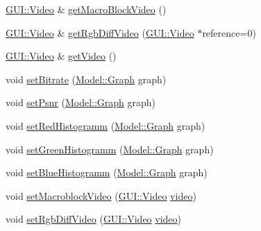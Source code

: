 \begin{DoxyCompactItemize}
\hyperlink{classGUI_1_1Video}{G\+U\+I\+::\+Video} \& \hyperlink{classModel_1_1EncodedVideo_ac27f73ee98887ca0325a2e411f2ac0a2}{get\+Macro\+Block\+Video} ()
\item 
\hyperlink{classGUI_1_1Video}{G\+U\+I\+::\+Video} \& \hyperlink{classModel_1_1EncodedVideo_a40bff15a57c48e30b074df886f469dcb}{get\+Rgb\+Diff\+Video} (\hyperlink{classGUI_1_1Video}{G\+U\+I\+::\+Video} $\ast$reference=0)
\item 
\hyperlink{classGUI_1_1Video}{G\+U\+I\+::\+Video} \& \hyperlink{classModel_1_1EncodedVideo_a98d400f18a58a86564ce1fb048bd5fad}{get\+Video} ()
\item 
void \hyperlink{classModel_1_1EncodedVideo_a60a6dd2db95a7b5512b119592154c542}{set\+Bitrate} (\hyperlink{classModel_1_1Graph}{Model\+::\+Graph} graph)
\item 
void \hyperlink{classModel_1_1EncodedVideo_a1ab9a88bf6af5d5c764512703becc453}{set\+Psnr} (\hyperlink{classModel_1_1Graph}{Model\+::\+Graph} graph)
\item 
void \hyperlink{classModel_1_1EncodedVideo_a50a774bf6d0a0445ad71fce4030f923b}{set\+Red\+Histogramm} (\hyperlink{classModel_1_1Graph}{Model\+::\+Graph} graph)
\item 
void \hyperlink{classModel_1_1EncodedVideo_a566ac8c5c38d5e9ff92033d425ad1af5}{set\+Green\+Histogramm} (\hyperlink{classModel_1_1Graph}{Model\+::\+Graph} graph)
\item 
void \hyperlink{classModel_1_1EncodedVideo_a73e0e302836a23164bc5fafc2efcb412}{set\+Blue\+Histogramm} (\hyperlink{classModel_1_1Graph}{Model\+::\+Graph} graph)
\item 
void \hyperlink{classModel_1_1EncodedVideo_a3487e25c309f036991a8fe323110fa54}{set\+Macroblock\+Video} (\hyperlink{classGUI_1_1Video}{G\+U\+I\+::\+Video} \hyperlink{classModel_1_1EncodedVideo_a03e0f42a43f7a856dd9881df4024fb4c}{video})
\item 
void \hyperlink{classModel_1_1EncodedVideo_a6e0348c09385e6f61ba1e222ebce33cd}{set\+Rgb\+Diff\+Video} (\hyperlink{classGUI_1_1Video}{G\+U\+I\+::\+Video} \hyperlink{classModel_1_1EncodedVideo_a03e0f42a43f7a856dd9881df4024fb4c}{video})
\end{DoxyCompactItemize}
